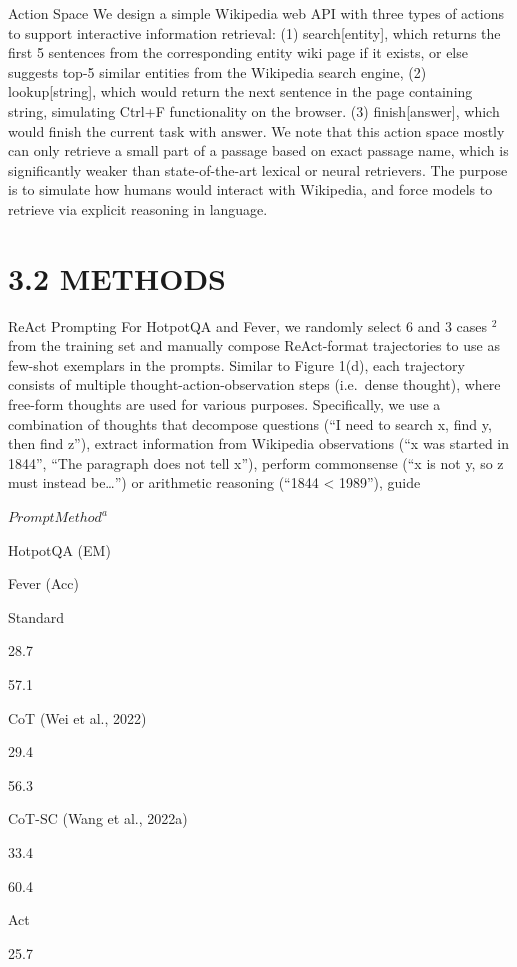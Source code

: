 \documentclass[
]{article}
\begin{document}
Action Space We design a simple Wikipedia web API with three types of
actions to support interactive information retrieval: (1)
search{[}entity{]}, which returns the first 5 sentences from the
corresponding entity wiki page if it exists, or else suggests top-5
similar entities from the Wikipedia search engine, (2)
lookup{[}string{]}, which would return the next sentence in the page
containing string, simulating Ctrl+F functionality on the browser. (3)
finish{[}answer{]}, which would finish the current task with answer. We
note that this action space mostly can only retrieve a small part of a
passage based on exact passage name, which is significantly weaker than
state-of-the-art lexical or neural retrievers. The purpose is to
simulate how humans would interact with Wikipedia, and force models to
retrieve via explicit reasoning in language.

\section{3.2 METHODS}\label{methods}

ReAct Prompting For HotpotQA and Fever, we randomly select 6 and 3 cases
\(^{2}\) from the training set and manually compose ReAct-format
trajectories to use as few-shot exemplars in the prompts. Similar to
Figure 1(d), each trajectory consists of multiple
thought-action-observation steps (i.e.~dense thought), where free-form
thoughts are used for various purposes. Specifically, we use a
combination of thoughts that decompose questions (``I need to search x,
find y, then find z''), extract information from Wikipedia observations
(``x was started in 1844'', ``The paragraph does not tell x''), perform
commonsense (``x is not y, so z must instead be\ldots'') or arithmetic
reasoning (``1844 \textless{} 1989''), guide

\(Prompt Method^a\)

HotpotQA (EM)

Fever (Acc)

Standard

28.7

57.1

CoT (Wei et al., 2022)

29.4

56.3

CoT-SC (Wang et al., 2022a)

33.4

60.4

Act

25.7
\end{document}
